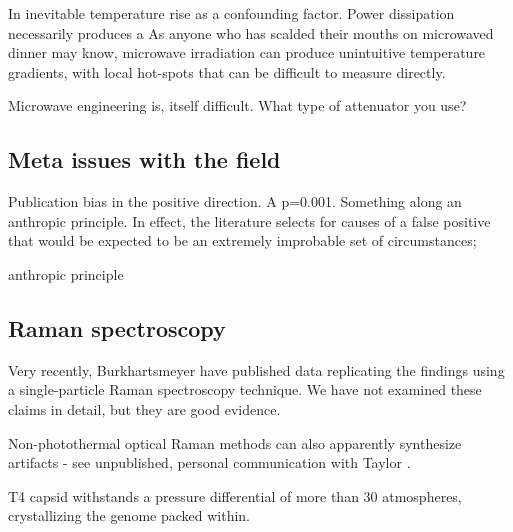 \documentclass[paper.tex]{subfiles}
\begin{document}
In inevitable temperature rise as a confounding factor. Power dissipation necessarily produces a  As anyone who has scalded their mouths on microwaved dinner may know, microwave irradiation can produce unintuitive temperature gradients, with local hot-spots that can be difficult to measure directly.


Microwave engineering is, itself  difficult. What type of attenuator you use?


\subsection{Meta issues with the field}


Publication bias in the positive direction. A p=0.001. Something along an anthropic principle. In effect, the literature selects for causes of a false positive that would be expected to be an extremely improbable set of circumstances; 

anthropic principle


\subsection{Raman spectroscopy}

Very recently, Burkhartsmeyer \cite{Optical2020} have published data replicating the findings using a single-particle Raman spectroscopy technique. We have not examined these claims in detail, but they are good evidence.

Non-photothermal optical Raman methods can also apparently synthesize artifacts - see unpublished, personal communication with Taylor \cite{mechanisms1981}. 






T4 capsid withstands a pressure differential of more than 30 atmospheres, crystallizing the genome packed within.





\cite{Osmotic2003}
\end{document}
